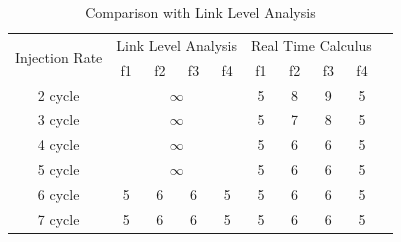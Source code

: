 \documentclass[10pt,journal]{IEEEtran}
\begin{document}
\begin{table}[htbp]
\centering
\caption{\label{LLAvsRTC}Comparison with Link Level Analysis}
\begin{tabular}{|c|c|c|c|c|c|c|c|c|c|}
\hline
\multirow{2}{*}{Injection Rate}  & \multicolumn{4}{|c|}{Link Level Analysis} & \multicolumn{4}{|c|}{Real Time Calculus} \\
\cline{2-9}
& f1 & f2 & f3 & f4 & f1 & f2 & f3 & f4\\
\hline\hline
2 cycle & \multicolumn{4}{|c|}{$\infty$} & 5 & 8 & 9 & 5\\
\hline
3 cycle & \multicolumn{4}{|c|}{$\infty$} & 5 & 7 & 8 & 5\\
\hline
4 cycle & \multicolumn{4}{|c|}{$\infty$} & 5 & 6 & 6 & 5\\
\hline
5 cycle & \multicolumn{4}{|c|}{$\infty$} & 5 & 6 & 6 & 5\\
\hline
6 cycle & 5 & 6 & 6 & 5 & 5 & 6 & 6 & 5\\
\hline
7 cycle & 5 & 6 & 6 & 5 & 5 & 6 & 6 & 5\\
\hline
\end{tabular}
\end{table}
\end{document}
